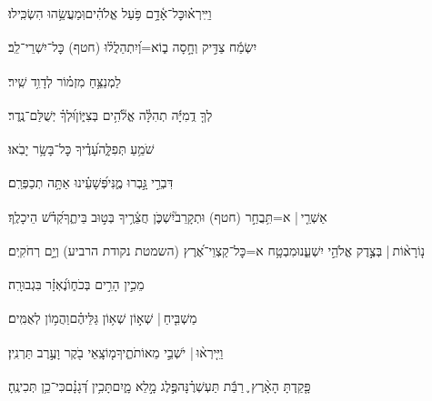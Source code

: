\documentclass[12pt]{article}
\newcommand{\loc}[1]{\textsuperscript{\locf{#1}}}
\begin{document}
{\loc{ י}~}‏וַיִּֽירְא֗וּ{\hfill}כׇּל־אָ֫דָ֥ם\newline\hspace*{.5em} פֹּ֥עַל אֱלֹהִ֗ים{\hfill}וּֽמַעֲשֵׂ֥הוּ הִשְׂכִּֽילוּ׃\par

{\loc{ יא}~}‏יִשְׂמַ֬ח צַדִּ֣יק  וְחָ֣סָה ב֑וֹ{\hfill}א=וְ֝יִתְהַלֲל֗וּ (חטף) כׇּל־יִשְׁרֵי־לֵֽב׃\par\pend
\ledpb
\pstart[\subsection*{\textcolor{red}{פרק סה}}]\label{פרק סה}
{\loc{ א}~}‏לַמְנַצֵּ֥חַ מִזְמ֗וֹר לְדָוִ֥ד שִֽׁיר׃\par

{\loc{ ב}~}‏לְךָ֤ דֻֽמִיָּ֬ה תְהִלָּ֓ה אֱלֹ֘הִ֥ים בְּצִיּ֑וֹן{\hfill}וּ֝לְךָ֗ יְשֻׁלַּם־נֶֽדֶר׃\par

{\loc{ ג}~}‏שֹׁמֵ֥עַ תְּפִלָּ֑ה{\hfill}עָ֝דֶ֗יךָ כׇּל־בָּשָׂ֥ר יָבֹֽאוּ׃\par

{\loc{ ד}~}‏דִּבְרֵ֣י  גָּ֣בְרוּ מֶ֑נִּי{\hfill}פְּ֝שָׁעֵ֗ינוּ אַתָּ֥ה תְכַפְּרֵֽם׃\par

{\loc{ ה}~}‏אַשְׁרֵ֤י |  א=תִּ֥בֲחַ֣ר (חטף) וּתְקָרֵב֮{\hfill}יִשְׁכֹּ֢ן חֲצֵ֫רֶ֥יךָ\newline\hspace*{.5em} בְּט֣וּב בֵּיתֶ֑ךָ{\hfill}קְ֝דֹ֗שׁ הֵיכָלֶֽךָ׃\par

{\loc{ ו}~}‏נ֤וֹרָא֨וֹת |  בְּצֶ֣דֶק  אֱלֹהֵ֣י יִשְׁעֵ֑נוּ{\hfill}מִבְטָ֥ח א=כׇּל־קַצְוֵי־אֶ֝רֶץ (השמטת נקודת הרביע) וְיָ֣ם רְחֹקִֽים׃\par

{\loc{ ז}~}‏מֵכִ֣ין הָרִ֣ים בְּכֹח֑וֹ{\hfill}נֶ֝אְזָ֗ר בִּגְבוּרָֽה׃\par

{\loc{ ח}~}‏מַשְׁבִּ֤יחַ | {\hfill}שְׁא֣וֹן \newline\hspace*{.5em}שְׁא֥וֹן גַּלֵּיהֶ֗ם{\hfill}וַהֲמ֥וֹן לְאֻמִּֽים׃\par

{\loc{ ט}~}‏וַיִּ֤ירְא֨וּ |  יֹשְׁבֵ֣י  מֵאוֹתֹתֶ֑יךָ{\hfill}מ֤וֹצָֽאֵי בֹ֖קֶר וָעֶ֣רֶב תַּרְנִֽין׃\par

{\loc{ י}~}‏פָּ֤קַֽדְתָּ הָאָ֨רֶץ ֪ רַבַּ֬ת תַּעְשְׁרֶ֗נָּה{\hfill}פֶּ֣לֶג  מָ֣לֵא מָ֑יִם\newline\hspace*{.5em}תָּכִ֥ין דְּ֝גָנָ֗ם{\hfill}כִּי־כֵ֥ן תְּכִינֶֽהָ׃\par
\end{document}

